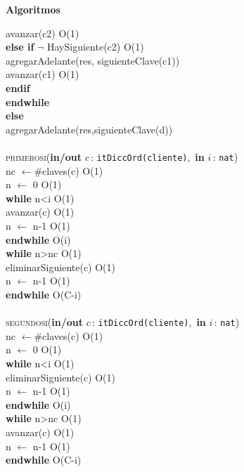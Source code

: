 \documentclass[10pt, a4paper]{article}
\let\NombreFuncion=\textsc
\let\TipoVariable=\texttt
\let\ModificadorArgumento=\textbf
\newcommand{\tab}{\hspace*{7mm}}
\newcommand{\In}[2]{\ModificadorArgumento{in} \ensuremath{#1}\,: \TipoVariable{#2}\xspace}
\newcommand{\Inout}[2]{\ModificadorArgumento{in/out} \ensuremath{#1}\,: \TipoVariable{#2}\xspace}
\newenvironment{Algoritmos}{%
  \vspace*{2ex}%
  \noindent\textbf{\Large Algoritmos}%
  \vspace*{2ex}%
}{}
\begin{document}
\begin{Algoritmos}
\tab \tab \tab avanzar(c2) \hfill O(1)
\\
\tab \tab \textbf{else if} $\neg$ HaySiguiente(c2) \hfill O(1)
\\ 
\tab \tab \tab agregarAdelante(res, siguienteClave(c1))
\\
\tab \tab \tab avanzar(c1) \hfill O(1)
\\
\tab \tab \textbf{endif}
\\
\tab \tab \textbf{endwhile}
\\
\tab \textbf{else}
\\
\tab agregarAdelante(res,siguienteClave(d))
\\ \\
\NombreFuncion{primerosi}(\Inout{c}{itDiccOrd(cliente)},\ \In{i} {nat})
\\
\tab nc $\leftarrow \#$claves(c) \hfill O(1)
\\
\tab n $\leftarrow$ 0 \hfill O(1)
\\
\tab \textbf{while} n<i \hfill O(1)
\\
\tab \tab avanzar(c) \hfill O(1)
\\
\tab \tab n $\leftarrow$ n-1 \hfill O(1)
\\
\tab \textbf{endwhile} \hfill O(i)
\\
\tab \textbf{while} n>nc \hfill O(1)
\\
\tab \tab eliminarSiguiente(c) \hfill O(1)
\\
\tab \tab n $\leftarrow$ n-1 \hfill O(1)
\\
\tab \textbf{endwhile} \hfill O(C-i)\\ \\
\NombreFuncion{segundosi}(\Inout{c}{itDiccOrd(cliente)},\ \In{i} {nat})
\\
\tab nc $\leftarrow \#$claves(c) \hfill O(1)
\\
\tab n $\leftarrow$ 0 \hfill O(1)
\\
\tab \textbf{while} n<i \hfill O(1)
\\
\tab \tab eliminarSiguiente(c) \hfill O(1)
\\
\tab \tab n $\leftarrow$ n-1 \hfill O(1)
\\
\tab \textbf{endwhile} \hfill O(i)
\\
\tab \textbf{while} n>nc \hfill O(1)
\\
\tab \tab avanzar(c) \hfill O(1)
\\
\tab \tab n $\leftarrow$ n-1 \hfill O(1)
\\
\tab \textbf{endwhile} \hfill O(C-i)
\\ \\

\end{Algoritmos}
\end{document}
